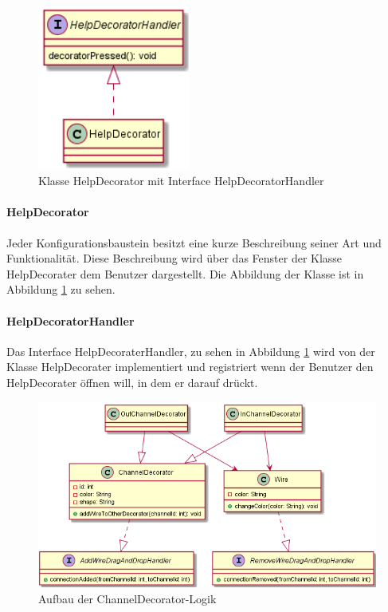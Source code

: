 \documentclass[parskip=full]{scrartcl}
\begin{document}
\begin{figure}[htbp]
	\begin{center}
		\includegraphics[width = 5cm]{Grafiken/View/HelpDecorator.png}
		\caption{Klasse HelpDecorator mit Interface HelpDecoratorHandler}
		\label{Help}
	\end{center}
\end{figure}

\paragraph{HelpDecorator}

Jeder Konfigurationsbaustein besitzt eine kurze Beschreibung seiner Art und Funktionalität. Diese Beschreibung wird über das Fenster der Klasse HelpDecorater dem Benutzer dargestellt. Die Abbildung der Klasse ist in Abbildung \ref{Help} zu sehen.

\paragraph{HelpDecoratorHandler}

Das Interface HelpDecoraterHandler, zu sehen in Abbildung \ref{Help} wird von der Klasse HelpDecorater implementiert und registriert wenn der Benutzer den HelpDecorater öffnen will, in dem er darauf drückt.

\begin{figure}[htbp]
	\begin{center}
		\includegraphics[width = 13cm]{Grafiken/View/ChannelDecorator.png}
		\caption{Aufbau der ChannelDecorator-Logik}
		\label{ChannelDecorator}
	\end{center}
\end{figure}
\end{document}
